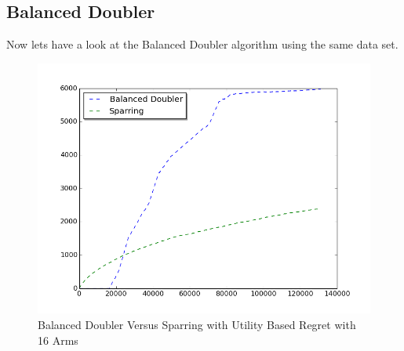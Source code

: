 \documentclass{llncs}
\begin{document}
\subsection{Balanced Doubler}
Now lets have a look at the Balanced Doubler algorithm using the same data set.
\begin{figure}[h!]
  \centering
     \includegraphics[scale=0.3]{figures/balanced_doubler_sparring_MQ2007_16arms.png} 
  \caption{Balanced Doubler Versus Sparring with Utility Based Regret with 16 Arms}
\end{figure}
\end{document}

